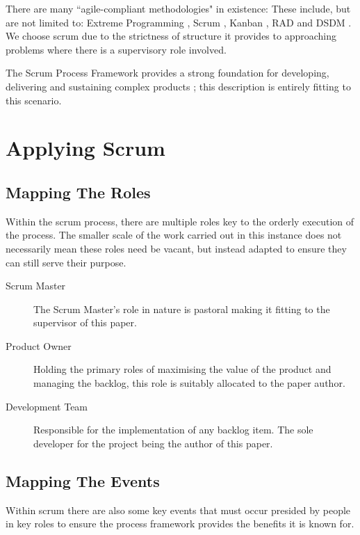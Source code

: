There are many ``agile-compliant methodologies" in existence: These include, but are not limited to: Extreme Programming \parencite{beck2000extreme}, Scrum \parencite{schwaber2017definitive}, Kanban \parencite{anderson2010kanban}, RAD \parencite{martin1991rapid} and DSDM \parencite{dsdm1995dynamic}. We choose scrum due to the strictness of structure it provides to approaching problems where there is a supervisory role involved. 

The Scrum Process Framework provides a strong foundation for developing, delivering and sustaining complex products \parencite{schwaber2017definitive}; this description is entirely fitting to this scenario.

\section{Applying Scrum}

\subsection{Mapping The Roles}

Within the scrum process, there are multiple roles key to the orderly execution of the process. The smaller scale of the work carried out in this instance does not necessarily mean these roles need be vacant, but instead adapted to ensure they can still serve their purpose.

\begin{description}
	\item[Scrum Master] The Scrum Master's role in nature is pastoral making it fitting to the supervisor of this paper.
	
	\item[Product Owner] Holding the primary roles of maximising the value of the product and managing the backlog, this role is suitably allocated to the paper author.
	
	\item[Development Team] Responsible for the implementation of any backlog item. The sole developer for the project being the author of this paper.
\end{description}

\newpage
\subsection{Mapping The Events}

Within scrum there are also some key events that must occur presided by people in key roles to ensure the process framework provides the benefits it is known for.

